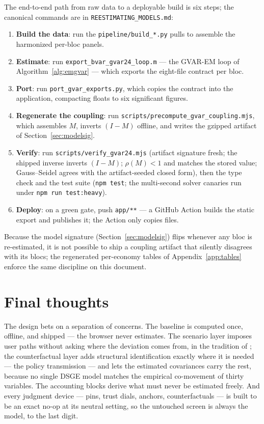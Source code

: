 \documentclass[11pt]{article}
\theoremstyle{plain}
\theoremstyle{remark}
\begin{document}
The end-to-end path from raw data to a deployable build is six steps;
the canonical commands are in \texttt{REESTIMATING\_MODELS.md}:
\begin{enumerate}
  \item \textbf{Build the data}: run the \texttt{pipeline/build\_*.py}
    pulls to assemble the harmonized per-bloc panels.
  \item \textbf{Estimate}: run
    \texttt{export\_bvar\_gvar24\_loop.m} --- the GVAR-EM loop of
    Algorithm~\ref{alg:emgvar} --- which exports the eight-file contract
    per bloc.
  \item \textbf{Port}: run \texttt{port\_gvar\_exports.py}, which
    copies the contract into the application, compacting floats to six
    significant figures.
  \item \textbf{Regenerate the coupling}: run
    \texttt{scripts/precompute\_gvar\_coupling.mjs}, which assembles
    $M$, inverts $(I-M)$ offline, and writes the gzipped artifact of
    Section~\ref{sec:modelsig}.
  \item \textbf{Verify}: run \texttt{scripts/verify\_gvar24.mjs}
    (artifact signature fresh; the shipped inverse inverts $(I-M)$;
    $\rho(M)<1$ and matches the stored value; Gauss--Seidel agrees with
    the artifact-seeded closed form), then the type check and the test
    suite (\texttt{npm test}; the multi-second solver canaries run under
    \texttt{npm run test:heavy}).
  \item \textbf{Deploy}: on a green gate, push \texttt{app/**} --- a
    GitHub Action builds the static export and publishes it; the Action
    only copies files.
\end{enumerate}
Because the model signature (Section~\ref{sec:modelsig}) flips whenever
any bloc is re-estimated, it is not possible to ship a coupling artifact
that silently disagrees with its blocs; the regenerated per-economy
tables of Appendix~\ref{app:tables} enforce the same discipline on this
document.

\section{Final thoughts}\label{sec:final}

The design bets on a separation of concerns. The baseline is computed
once, offline, and shipped --- the browser never estimates. The scenario
layer imposes user paths without asking where the deviation comes from,
in the tradition of \citet{WaggonerZha1999}; the counterfactual layer
adds structural identification exactly where it is needed --- the policy
transmission --- and lets the estimated covariances carry the rest,
because no single DSGE model matches the empirical co-movement of thirty
variables. The accounting blocks derive what must never be estimated
freely. And every judgment device --- pins, trust dials, anchors,
counterfactuals --- is built to be an exact no-op at its neutral
setting, so the untouched screen is always the model, to the last digit.
\end{document}
